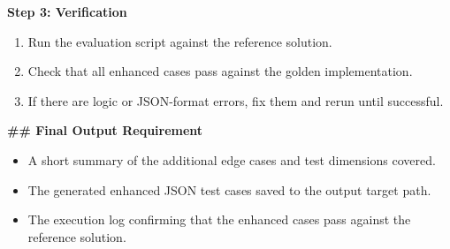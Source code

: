 \begin{promptbox}
\textbf{Step 3: Verification}
\begin{enumerate}
\item Run the evaluation script against the reference solution.
\item Check that all enhanced cases pass against the golden implementation.
\item If there are logic or JSON-format errors, fix them and rerun until successful.
\end{enumerate}

\textbf{\#\# Final Output Requirement}
\begin{itemize}
\item A short summary of the additional edge cases and test dimensions covered.
\item The generated enhanced JSON test cases saved to the output target path.
\item The execution log confirming that the enhanced cases pass against the reference solution.
\end{itemize}
\end{promptbox}
